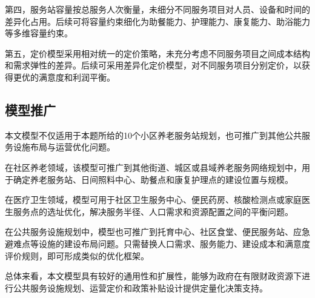 \documentclass[UTF8]{ctexart}
\begin{document}
第四，服务站容量按总服务人次衡量，未细分不同服务项目对人员、设备和时间的差异化占用。后续可将容量约束细化为助餐能力、护理能力、康复能力、助浴能力等多维容量约束。

第五，定价模型采用相对统一的定价策略，未充分考虑不同服务项目之间成本结构和需求弹性的差异。后续可采用差异化定价模型，对不同服务项目分别定价，以获得更优的满意度和利润平衡。

\subsection{模型推广}

本文模型不仅适用于本题所给的10个小区养老服务站规划，也可推广到其他公共服务设施布局与运营优化问题。

在社区养老领域，该模型可推广到其他街道、城区或县域养老服务网络规划中，用于确定养老服务站、日间照料中心、助餐点和康复护理点的建设位置与规模。

在医疗卫生领域，模型可用于社区卫生服务中心、便民药房、核酸检测点或家庭医生服务点的选址优化，解决服务半径、人口需求和资源配置之间的平衡问题。

在公共服务设施规划中，模型也可推广到托育中心、社区食堂、便民服务站、应急避难点等设施的建设布局问题。只需替换人口需求、服务能力、建设成本和满意度评价规则，即可形成类似的优化框架。

总体来看，本文模型具有较好的通用性和扩展性，能够为政府在有限财政资源下进行公共服务设施规划、运营定价和政策补贴设计提供定量化决策支持。
\end{document}
